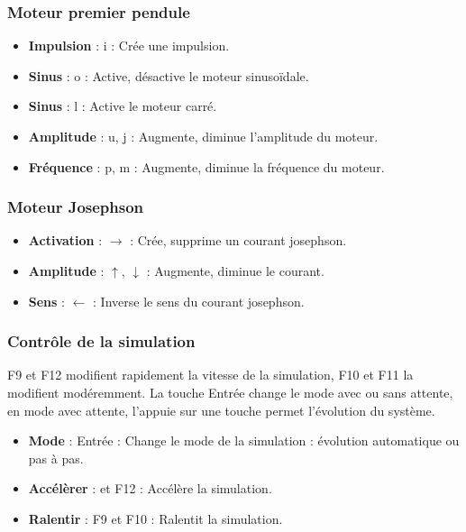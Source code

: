\subsubsection{Moteur premier pendule}
%
\begin{itemize}[label=, leftmargin=2cm, itemsep=0pt]
\item {\bf Impulsion} : {\sf i} : Crée une impulsion.
\item {\bf Sinus} : {\sf o} : Active, désactive le moteur sinusoïdale.
\item {\bf Sinus} : {\sf l} : Active le moteur carré.
\item {\bf Amplitude} : {\sf u, j} :  Augmente, diminue l'amplitude du moteur.
\item {\bf Fréquence} : {\sf p, m} :  Augmente, diminue la fréquence du moteur.
\end{itemize}
%
%
\subsubsection{Moteur Josephson}
%
\begin{itemize}[label=, leftmargin=2cm, itemsep=0pt]
\item {\bf Activation} : $\rightarrow$ : Crée, supprime un courant josephson.
\item {\bf Amplitude} : $\mathtt{\uparrow}$, $\mathsf{\downarrow}$ : Augmente, diminue le courant.
\item {\bf Sens} : {\sf $\leftarrow$} : Inverse le sens du courant josephson.
\end{itemize}
%
%
\subsubsection{Contrôle de la simulation}
%
{\sf F9} et {\sf F12} modifient rapidement la vitesse de la simulation, {\sf F10} et {\sf F11} la modifient modéremment. La touche {\sf Entrée} change le mode avec ou sans attente, en mode avec attente, l'appuie sur une touche permet l'évolution du système.
%
\begin{itemize}[label=, leftmargin=2cm, itemsep=0pt]
\item {\bf Mode} : {\sf Entrée} : Change le mode de la simulation : évolution automatique ou pas à pas.
\item {\bf Accélèrer} : {} et {\sf F12} : Accélère la simulation.
\item {\bf Ralentir} : {\sf F9} et {\sf F10} : Ralentit la simulation.
\end{itemize}
%
%
